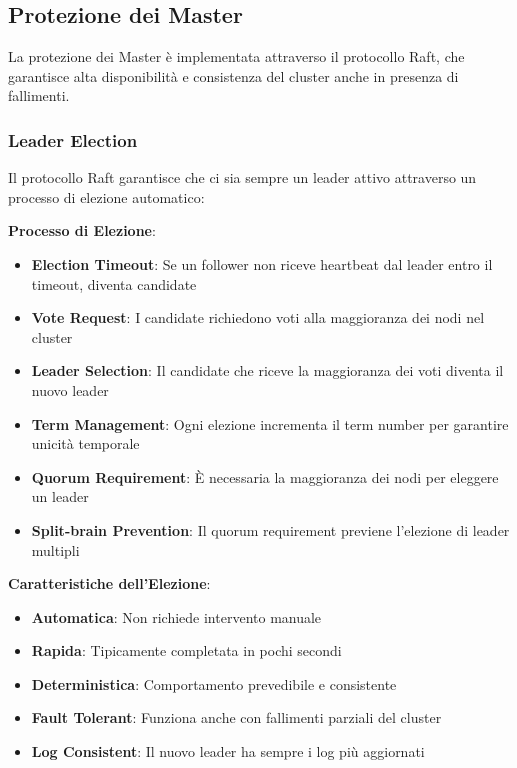 \documentclass[12pt,a4paper]{article}
\begin{document}
\subsection{Protezione dei Master}

La protezione dei Master è implementata attraverso il protocollo Raft, che garantisce alta disponibilità e consistenza del cluster anche in presenza di fallimenti.

\subsubsection{Leader Election}

Il protocollo Raft garantisce che ci sia sempre un leader attivo attraverso un processo di elezione automatico:

\textbf{Processo di Elezione}:
\begin{itemize}
\item \textbf{Election Timeout}: Se un follower non riceve heartbeat dal leader entro il timeout, diventa candidate
\item \textbf{Vote Request}: I candidate richiedono voti alla maggioranza dei nodi nel cluster
\item \textbf{Leader Selection}: Il candidate che riceve la maggioranza dei voti diventa il nuovo leader
\item \textbf{Term Management}: Ogni elezione incrementa il term number per garantire unicità temporale
\item \textbf{Quorum Requirement}: È necessaria la maggioranza dei nodi per eleggere un leader
\item \textbf{Split-brain Prevention}: Il quorum requirement previene l'elezione di leader multipli
\end{itemize}

\textbf{Caratteristiche dell'Elezione}:
\begin{itemize}
\item \textbf{Automatica}: Non richiede intervento manuale
\item \textbf{Rapida}: Tipicamente completata in pochi secondi
\item \textbf{Deterministica}: Comportamento prevedibile e consistente
\item \textbf{Fault Tolerant}: Funziona anche con fallimenti parziali del cluster
\item \textbf{Log Consistent}: Il nuovo leader ha sempre i log più aggiornati
\end{itemize}
\end{document}
